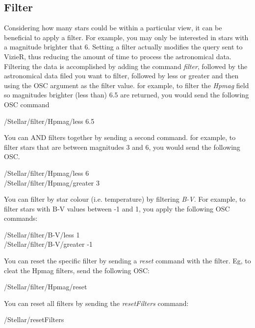 \subsection{Filter}
Considering how many stars could be within a particular view, it can be beneficial to apply a filter.  For example, you may only be interested in stars with a magnitude brighter that 6. Setting a filter actually modifies the query sent to VizieR, thus reducing the amount of time to process the astronomical data.
Filtering the data is accomplished by adding the command \textit{filter}, followed by the astronomical data filed you want to filter, followed by less or greater and then using the OSC argument as the filter value.  for example, to filter the \textit{Hpmag} field so magnitudes brighter (less than) 6.5 are returned, you would send the following OSC command
   
    \begin{syntax}	  
   	\medskip
   	/Stellar/filter/Hpmag/less 6.5
   	\medskip
   \end{syntax}  

You can AND filters together by sending a second command. for example, to filter stars that are between magnitudes 3 and 6, you would send the following OSC.
    \begin{syntax}	
	\medskip
	/Stellar/filter/Hpmag/less 6\\
	/Stellar/filter/Hpmag/greater 3
	\medskip
\end{syntax}  

You can filter by star colour (i.e. temperature) by filtering \textit{B-V}. For example, to filter stars with  B-V values between -1 and 1, you apply the following OSC commands:
     \begin{syntax}	
 	\medskip
 	/Stellar/filter/B-V/less 1\\
 	/Stellar/filter/B-V/greater -1
 	\medskip
\end{syntax}  

You can reset the specific filter by sending a \textit{reset} command with the filter. Eg, to cleat the Hpmag filters, send the following OSC:
    \begin{syntax}	
	\medskip
	/Stellar/filter/Hpmag/reset
	\medskip
\end{syntax}  


You can reset all filters by sending the \textit{resetFilters} command:
\begin{syntax}	
	\medskip
	/Stellar/resetFilters
	\medskip
\end{syntax}  
